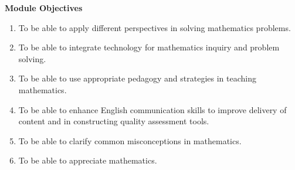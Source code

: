 \documentclass[svgnames,a4paper]{report}
\begin{document}
\begin{titlepage}
\begin{center}
{\LARGE\bfseries Module Objectives}
\begin{enumerate}
\item To be able to apply different perspectives in solving mathematics
problems.
\item To be able to integrate technology for mathematics inquiry and problem
solving.
\item To be able to use appropriate pedagogy and strategies in teaching
mathematics.
\item To be able to enhance English communication skills to improve delivery
of content and in constructing quality assessment tools.
\item To be able to clarify common misconceptions in mathematics.
\item To be able to appreciate mathematics.
\end{enumerate}
\end{center}
\end{titlepage}
\thispagestyle{empty}
\tableofcontents
\thispagestyle{empty}
\pagestyle{fancy}
\nocite{*}

\printbibliography[keyword=Module1,heading=subbibliography,title={REFERENCES}]

\printbibliography[keyword=Module2,heading=subbibliography,title={REFERENCES}]

\printbibliography[keyword=Module3,heading=subbibliography,title={REFERENCES}]

\printbibliography[keyword=Module4,heading=subbibliography,title={REFERENCES}]

\printbibliography[keyword=Module5,heading=subbibliography,title={REFERENCES}]

\printbibliography[keyword=Module6,heading=subbibliography,title={REFERENCES}]

\printbibliography[keyword=Module7,heading=subbibliography,title={REFERENCES}]

\printbibliography[keyword=Module8,heading=subbibliography,title={REFERENCES}]

\printbibliography[keyword=Module9,heading=subbibliography,title={REFERENCES}]


\printbibliography
\printindex
\end{document}
